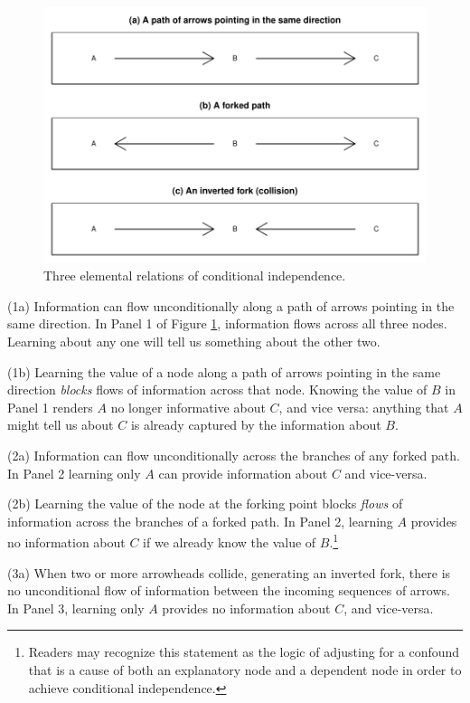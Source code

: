 \documentclass[
  12pt,
]{book}
\begin{document}
\begin{figure}

{\centering \includegraphics[width=0.7\linewidth]{ii_files/figure-latex/pathsexp-1} 

}

\caption{Three elemental relations of conditional independence.}\label{fig:pathsexp}
\end{figure}

(1a) Information can flow unconditionally along a path of arrows pointing in the same direction. In Panel 1 of Figure \ref{fig:pathsexp}, information flows across all three nodes. Learning about any one will tell us something about the other two.

(1b) Learning the value of a node along a path of arrows pointing in the same direction \emph{blocks} flows of information across that node. Knowing the value of \(B\) in Panel 1 renders \(A\) no longer informative about \(C\), and vice versa: anything that \(A\) might tell us about \(C\) is already captured by the information about \(B\).

(2a) Information can flow unconditionally across the branches of any forked path. In Panel 2 learning only \(A\) can provide information about \(C\) and vice-versa.

(2b) Learning the value of the node at the forking point blocks \emph{flows} of information across the branches of a forked path. In Panel 2, learning \(A\) provides no information about \(C\) if we already know the value of \(B\).\footnote{Readers may recognize this statement as the logic of adjusting for a confound that is a cause of both an explanatory node and a dependent node in order to achieve conditional independence.}

(3a) When two or more arrowheads collide, generating an inverted fork, there is no unconditional flow of information between the incoming sequences of arrows. In Panel 3, learning only \(A\) provides no information about \(C\), and vice-versa.
\end{document}
